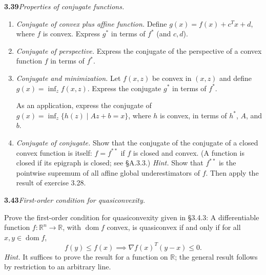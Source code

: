 \documentclass[11pt,a4paper]{article}
\newcommand{\R}{\mathbb{R}}
\newcommand{\dom}{\operatorname{dom}}
\newcommand{\ex}[2]{%
  \Needspace{5\baselineskip}%
  \par\medskip\noindent\textbf{#1}\quad\textit{#2}\quad\ignorespaces
}
\begin{document}
\ex{3.39}{Properties of conjugate functions.}
\begin{enumerate}
\item \textit{Conjugate of convex plus affine function.} Define
$g(x)=f(x)+c^Tx+d$, where $f$ is convex. Express $g^*$ in terms of $f^*$
(and $c,d$).
\item \textit{Conjugate of perspective.} Express the conjugate of the perspective
of a convex function $f$ in terms of $f^*$.
\item \textit{Conjugate and minimization.} Let $f(x,z)$ be convex in $(x,z)$
and define $g(x)=\inf_z f(x,z)$. Express the conjugate $g^*$ in terms of $f^*$.

As an application, express the conjugate of
$g(x)=\inf_z\{h(z)\mid Az+b=x\}$, where $h$ is convex, in terms of $h^*$,
$A$, and $b$.
\item \textit{Conjugate of conjugate.} Show that the conjugate of the conjugate
of a closed convex function is itself: $f=f^{**}$ if $f$ is closed and convex.
(A function is closed if its epigraph is closed; see \S A.3.3.)
\textit{Hint.} Show that $f^{**}$ is the pointwise supremum of all affine global
underestimators of $f$. Then apply the result of exercise 3.28.
\end{enumerate}

\ex{3.43}{First-order condition for quasiconvexity.}
Prove the first-order condition for quasiconvexity given in \S3.4.3:
A differentiable function $f:\R^n\to\R$, with $\dom f$ convex, is
quasiconvex if and only if for all $x,y\in\dom f$,
\[
  f(y)\leq f(x)\implies\nabla f(x)^T(y-x)\leq0.
\]
\textit{Hint.} It suffices to prove the result for a function on $\R$; the
general result follows by restriction to an arbitrary line.
\end{document}
